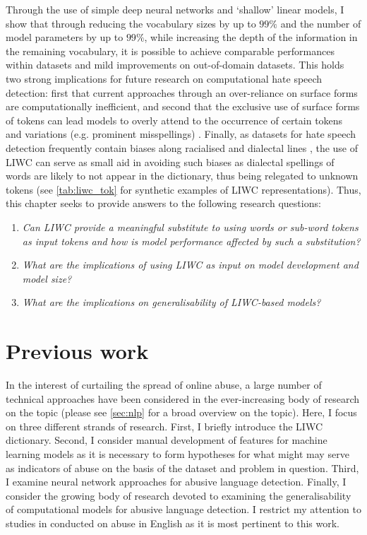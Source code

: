 Through the use of simple deep neural networks and `shallow' linear models, I show that through reducing the vocabulary sizes by up to $99\%$ and the number of model parameters by up to $99\%$, while increasing the depth of the information in the remaining vocabulary, it is possible to achieve comparable performances within datasets and mild improvements on out-of-domain datasets. This holds two strong implications for future research on computational hate speech detection: first that current approaches through an over-reliance on surface forms are computationally inefficient, and second that the exclusive use of surface forms of tokens can lead models to overly attend to the occurrence of certain tokens and variations (e.g. prominent misspellings) \citep{Rottger:2021}. Finally, as datasets for hate speech detection frequently contain biases along racialised and dialectal lines \citep{Waseem:2018,Davidson:2019}, the use of LIWC can serve as small aid in avoiding such biases as dialectal spellings of words are likely to not appear in the dictionary, thus being relegated to unknown tokens (see \cref{tab:liwc_tok} for synthetic examples of LIWC representations). Thus, this chapter seeks to provide answers to the following research questions:

\begin{minipage}{0.9\textwidth}
\vspace{5mm}
    \begin{enumerate}[start=1, label={\textbf{RQ \arabic*}}]
        \item{\textit{Can LIWC provide a meaningful substitute to using words or sub-word tokens as input tokens and how is model performance affected by such a substitution?}}
        \item{\textit{What are the implications of using LIWC as input on model development and model size?}}
        \item{\textit{What are the implications on generalisability of LIWC-based models?}}
    \end{enumerate}
\end{minipage}

\newpage
\section{Previous work}

In the interest of curtailing the spread of online abuse, a large number of technical approaches have been considered in the ever-increasing body of research on the topic (please see \cref{sec:nlp} for a broad overview on the topic). Here, I focus on three different strands of research. First, I briefly introduce the LIWC dictionary. Second, I consider manual development of features for machine learning models as it is necessary to form hypotheses for what might may serve as indicators of abuse on the basis of the dataset and problem in question. Third, I examine neural network approaches for abusive language detection. Finally, I consider the growing body of research devoted to examining the generalisability of computational models for abusive language detection. I restrict my attention to studies in conducted on abuse in English as it is most pertinent to this work.

